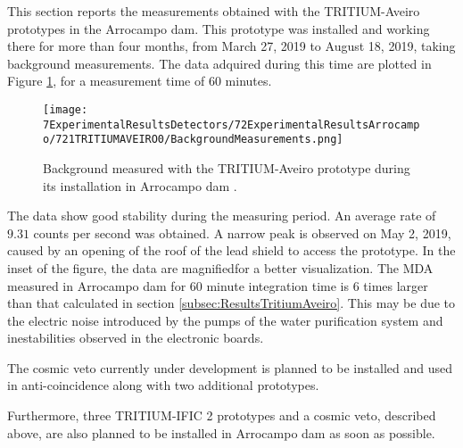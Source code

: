 This section reports the measurements obtained with the TRITIUM-Aveiro prototypes in the Arrocampo dam. This prototype was installed and working there for more than four months, from March 27, 2019 to August 18, 2019, taking background measurements. The data adquired during this time are plotted in Figure \ref{fig:BackgroundArrocampoAveiro}, for a measurement time of 60 minutes.

\begin{figure}[h]
\centering
\texttt{[image: 7ExperimentalResultsDetectors/72ExperimentalResultsArrocampo/721TRITIUMAVEIRO0/BackgroundMeasurements.png]}
\caption{Background measured with the TRITIUM-Aveiro prototype during its installation in Arrocampo dam \cite{ExperimentalPaperCarlos}.\label{fig:BackgroundArrocampoAveiro}}
\end{figure}
The data show good stability during the measuring period. An average rate of $9.31$ counts per second was obtained. A narrow peak is observed on May 2, 2019, caused by an opening of the roof of the lead shield to access the prototype. In the inset of the figure, the data are magnifiedfor a better visualization. The MDA measured in Arrocampo dam for 60 minute integration time is 6 times larger than that calculated in section \ref{subsec:ResultsTritiumAveiro}. This may be due to the electric noise introduced by the pumps of the water purification system and inestabilities observed in the electronic boards.

The cosmic veto currently under development is planned to be installed and used in anti-coincidence along with two additional prototypes.

Furthermore, three TRITIUM-IFIC 2 prototypes and a cosmic veto, described above, are also planned to be installed in Arrocampo dam as soon as possible.